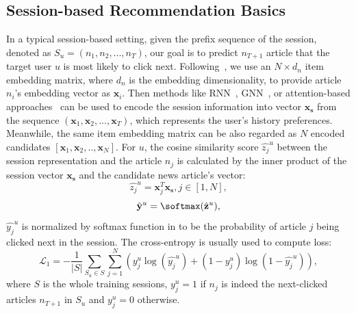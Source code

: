 \subsection{Session-based Recommendation Basics}
In a typical session-based setting, given the prefix sequence of the session, denoted as $S_u=(n_1, n_2,...,n_T)$, our goal is 
to predict $n_{T+1}$ article that the target user $u$ is most likely to click next. 
Following~\cite{liu2018stamp}, we use an $N\times d_n$ 
item embedding matrix, where $d_n$ is the embedding dimensionality, to provide article $n_i$'s embedding vector
as $\mathbf{x}_i$. Then methods like RNN~\cite{hidasi2018recurrent}, GNN~\cite{wu2019session,pan2020star}, 
or attention-based approaches~\cite{kang_self-attentive_2018,liu2018stamp} can be used to 
encode the session information into vector $\mathbf{x_s}$ from the sequence 
${(\mathbf{x}_1, \mathbf{x}_2, ..., \mathbf{x}_T)}$, which represents the user's history preferences.
Meanwhile, the same item embedding matrix can be also regarded as $N$ encoded candidates $[\mathbf{x}_1, \mathbf{x}_2,.., \mathbf{x}_N]$.
For $u$, the cosine similarity score $\hat{z_j}^u$ between the session representation and the article $n_j$ is calculated by the inner product of the session vector $\mathbf{x_s}$ and the candidate news article's vector:
\begin{equation}
    \label{eq:zj}
    \hat{z_j}^u = \mathbf{x}_j^T\mathbf{x_s}, j\in[1,N],
\end{equation}
\begin{equation}
    \label{eq:yy}
    \hat{\mathbf{y}}^u = \softmax(\hat{\mathbf{z}}^u),
\end{equation}
$\hat{y_j}^u$ is normalized by softmax function in  to be the probability of article $j$ being clicked next in the session. 
The cross-entropy is usually used to compute loss:
\begin{equation}
    \mathcal{L}_1 = - \frac{1}{|S|}\sum_{S_u \in S}\sum_{j=1}^N ( y_j^u \log(\hat{y_j}^u) + (1-y_j^u)\log(1-\hat{y_j}^u)),
\end{equation}
where $S$ is the whole training sessions, $y_j^u=1$ if $n_j$ is indeed the next-clicked articles $n_{T+1}$ in $S_u$ and $y_j^u=0$ otherwise.

